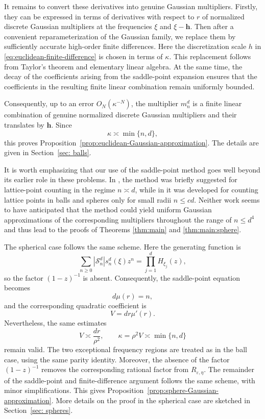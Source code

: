 \documentclass{article}
\theoremstyle{plain}
\numberwithin{equation}{section}
\begin{document}
It remains to convert these derivatives into genuine Gaussian
multipliers. Firstly, they can be expressed in terms of derivatives
with respect to \(r\) of normalized discrete Gaussian multipliers at
the frequencies \(\xi\) and \(\xi-\mathbf h\). Then after a convenient
reparameterization of the Gaussian family, we replace them by
sufficiently accurate high-order finite differences. Here the
discretization scale \(h\) in
\eqref{eq:euclidean-finite-difference} is chosen in terms of
\(\kappa\). This replacement follows from Taylor's theorem and
elementary linear algebra. At the same time, the decay of the
coefficients arising from the saddle-point expansion ensures that
the coefficients in the resulting finite linear combination remain
uniformly bounded.

Consequently, up to an error \(O_N(\kappa^{-N})\), the multiplier
\(m_n^d\) is a finite linear combination of genuine normalized
discrete Gaussian multipliers and their translates by \(\mathbf h\).
Since
\[
\kappa\asymp\min\{n,d\},
\]
this proves
Proposition~\ref{prop:euclidean-Gaussian-approximation}. The details
are given in Section~\ref{sec: balls}.

It is worth emphasizing that our use of the saddle-point method 
goes well beyond its earlier role in these problems. In \cite{MazoOdlyzko}, the method was
briefly suggested for lattice-point counting in the regime
\(n\asymp d\), while in \cite{NiksinskiWrobel} it was developed for counting
lattice points in balls and spheres only for small radii \(n\leq cd\). Neither work seems to have anticipated that the method
could yield uniform Gaussian approximations of the corresponding
multipliers throughout the range of \(n\le d^4\) and thus lead to the proofs of Theorems \ref{thm:main} and \ref{thm:main:sphere}.

The spherical case follows the same scheme. Here the generating
function is
\[
\sum_{n\geq0}|\mathcal S_n^d|s_n^d(\xi)z^n
=
\prod_{j=1}^dH_{\xi_j}(z),
\]
so the factor \((1-z)^{-1}\) is absent. Consequently, the saddle-point
equation becomes
\[
d\mu(r)=n,
\]
and the corresponding quadratic coefficient is
\[
V=dr\mu'(r).
\]
Nevertheless, the same estimates
\[
V\asymp\frac{dr}{\rho^2},
\qquad
\kappa=\rho^2V\asymp\min\{n,d\}
\]
remain valid. The two exceptional frequency regions are treated as in
the ball case, using the same parity identity. Moreover, the absence
of the factor \((1-z)^{-1}\) removes the corresponding rational factor
from \(R_{\varepsilon,\eta}\). The remainder of the saddle-point and
finite-difference argument follows the same scheme, with minor
simplifications. This gives
Proposition~\ref{prop:sphere-Gaussian-approximation}. More details on
the proof in the spherical case are sketched in Section~\ref{sec: spheres}.
\end{document}
